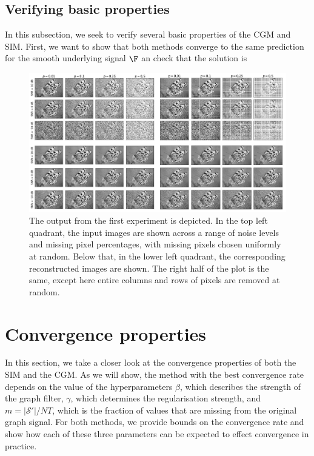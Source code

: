 \subsection{Verifying basic properties}

In this subsection, we seek to verify several basic properties of the CGM and SIM. First, we want to show that both methods converge to the same prediction for the smooth underlying signal $\F$ an check that the solution is 


\begin{figure}[t]
    \hypertarget{butterflies}{}
    \label{fig:butterflies}
    \begin{center}
        \includegraphics[width=0.95\linewidth]{Figures/butterflies.jpg}
    \end{center}
    \caption{\small{The output from the first experiment is depicted. In the top left quadrant, the input images are shown across a range of noise levels and missing pixel percentages, with missing pixels chosen uniformly at random. Below that, in the lower left quadrant, the corresponding reconstructed images are shown. The right half of the plot is the same, except here entire columns and rows of pixels are removed at random.}}
\end{figure}


\section{Convergence properties}

\label{sec:convergence}


In this section, we take a closer look at the convergence properties of both the SIM and the CGM. As we will show, the method with the best convergence rate depends on the value of the hyperparameters $\beta$, which describes the strength of the graph filter, $\gamma$, which determines the regularisation strength, and $m=|\mathcal{S}'|/NT$, which is the fraction of values that are missing from the original graph signal. For both methods, we provide bounds on the convergence rate and show how each of these three parameters can be expected to effect convergence in practice. 

